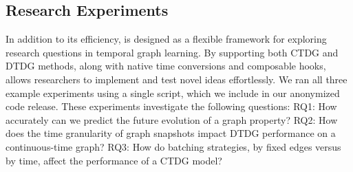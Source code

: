 \begin{table}[t]
\centering
\caption{The choice of snapshot time granularity significantly affects link prediction performance. Reported metric is MRR (↑) with the \hfirst{} and \hsecond{} best result for each dataset highlighted.}
\label{tab:snapshot_granularity_effect}
\small
\setlength{\tabcolsep}{4pt}
\renewcommand{\arraystretch}{0.9}
\end{table}


\subsection{\name Research Experiments}
\label{sec:research_exp}

In addition to its efficiency, \name is designed as a flexible framework for exploring research questions in temporal graph learning. By supporting both CTDG and DTDG methods, along with native time conversions and composable hooks, \name allows researchers to implement and test novel ideas effortlessly. We ran all three example experiments using a single script, which we include in our anonymized code release. These experiments investigate the following questions: RQ1: How accurately can we predict the future evolution of a graph property? RQ2: How does the time granularity of graph snapshots impact DTDG performance on a continuous-time graph? RQ3: How do batching strategies, by fixed edges versus by time, affect the performance of a CTDG model?


